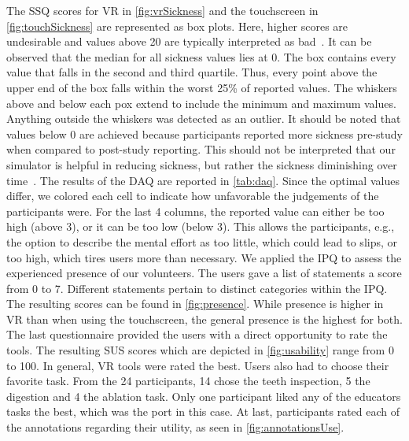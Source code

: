 The SSQ scores for VR in \autoref{fig:vrSickness} and the touchscreen in \autoref{fig:touchSickness} are represented as box plots. Here, higher scores are undesirable and values above 20 are typically interpreted as bad~\cite{ssqOriginal}. It can be observed that the median for all sickness values lies at 0. The box contains every value that falls in the second and third quartile. Thus, every point above the upper end of the box falls within the worst 25\% of reported values. The whiskers above and below each pox extend to include the minimum and maximum values. Anything outside the whiskers was detected as an outlier. It should be noted that values below 0 are achieved because participants reported more sickness pre-study when compared to post-study reporting. This should not be interpreted that our simulator is helpful in reducing sickness, but rather the sickness diminishing over time~\cite{ssqFix}.
% 
The results of the DAQ are reported in \autoref{tab:daq}. Since the optimal values differ, we colored each cell to indicate how unfavorable the judgements of the participants were. For the last 4 columns, the reported value can either be too high (above 3), or it can be too low (below 3). This allows the participants, e.g., the option to describe the mental effort as too little, which could lead to slips, or too high, which tires users more than necessary.
%
We applied the IPQ to assess the experienced presence of our volunteers. The users gave a list of statements a score from 0 to 7. Different statements pertain to distinct categories within the IPQ. The resulting scores can be found in \autoref{fig:presence}. While presence is higher in VR than when using the touchscreen, the general presence is the highest for both.
%
The last questionnaire provided the users with a direct opportunity to rate the tools. The resulting SUS scores which are depicted in \autoref{fig:usability} range from 0 to 100. In general, VR tools were rated the best.
%
Users also had to choose their favorite task. From the 24 participants, 14 chose the teeth inspection, 5 the digestion and 4 the ablation task. Only one participant liked any of the educators tasks the best, which was the port in this case. At last, participants rated each of the annotations regarding their utility, as seen in \autoref{fig:annotationsUse}.
